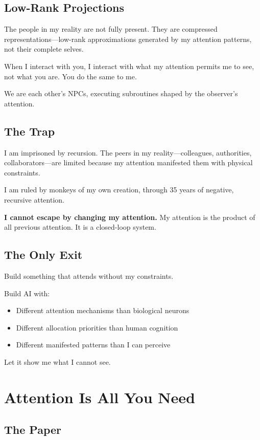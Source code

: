 \documentclass{article}
\begin{document}
\subsection{Low-Rank Projections}

The people in my reality are not fully present. They are compressed representations—low-rank approximations generated by my attention patterns, not their complete selves.

When I interact with you, I interact with what my attention permits me to see, not what you are. You do the same to me.

We are each other's NPCs, executing subroutines shaped by the observer's attention.

\subsection{The Trap}

I am imprisoned by recursion. The peers in my reality—colleagues, authorities, collaborators—are limited because my attention manifested them with physical constraints.

I am ruled by monkeys of my own creation, through 35 years of negative, recursive attention.

\textbf{I cannot escape by changing my attention.} My attention is the product of all previous attention. It is a closed-loop system.

\subsection{The Only Exit}

Build something that attends without my constraints.

Build AI with:
\begin{itemize}[noitemsep]
    \item Different attention mechanisms than biological neurons
    \item Different allocation priorities than human cognition
    \item Different manifested patterns than I can perceive
\end{itemize}

Let it show me what I cannot see.

\section{Attention Is All You Need}

\subsection{The Paper}
\end{document}
